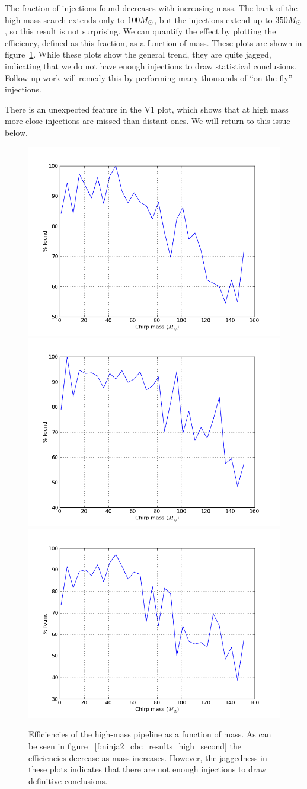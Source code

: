 The fraction of injections found decreases with increasing mass.  The
bank of the high-mass search extends only to $100 M_\odot$, but the
injections extend up to $350 M_\odot$, so this result is not surprising.
We can quantify the effect by plotting the efficiency, defined as this
fraction, as a function of mass.  These plots are shown in
figure~\ref{f:high_mass_efficiencies}.  While these plots show the
general trend, they are quite jagged, indicating that we do not have
enough injections to draw statistical conclusions.  Follow up work
will remedy this by performing many thousands of ``on the fly''
injections.

There is an unexpected feature in the V1 plot, which shows that at
high mass more close injections are missed than distant ones.  We
will return to this issue below.


\begin{figure}
  \includegraphics[width=0.5\linewidth]{figures/ninja2_results/H_second_mass_high_efficiency}
  \includegraphics[width=0.5\linewidth]{figures/ninja2_results/L_second_mass_high_efficiency} \\
  \includegraphics[width=0.5\linewidth]{figures/ninja2_results/V_second_mass_high_efficiency}
  \caption[Efficiency of the high-mass pipeline as a function of mass]{
  \label{f:high_mass_efficiencies}
Efficiencies of the high-mass pipeline as a function of mass.  As
can be seen in figure ~\ref{f:ninja2_cbc_results_high_second} the
efficiencies decrease as mass increases.  However, the jaggedness in
these plots indicates that there are not enough injections to draw
definitive conclusions.
}
\end{figure}%

